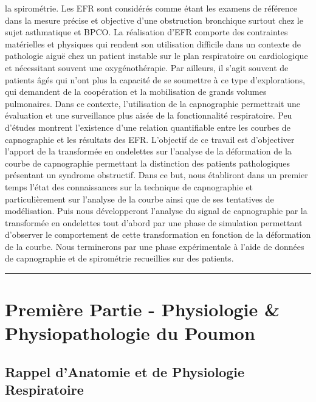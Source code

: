 \documentclass[12pt,]{article}
\begin{document}
la spirométrie. Les EFR sont considérés comme étant les examens de
référence dans la mesure précise et objective d'une obstruction
bronchique surtout chez le sujet asthmatique et BPCO. La réalisation
d'EFR comporte des contraintes matérielles et physiques qui rendent son
utilisation difficile dans un contexte de pathologie aiguë chez un
patient instable sur le plan respiratoire ou cardiologique et
nécessitant souvent une oxygénothérapie. Par ailleurs, il s'agit souvent
de patients âgés qui n'ont plus la capacité de se soumettre à ce type
d'explorations, qui demandent de la coopération et la mobilisation de
grands volumes pulmonaires. Dans ce contexte, l'utilisation de la
capnographie permettrait une évaluation et une surveillance plus aisée
de la fonctionnalité respiratoire. Peu d'études montrent l'existence
d'une relation quantifiable entre les courbes de capnographie et les
résultats des EFR. L'objectif de ce travail est d'objectiver l'apport de
la transformée en ondelettes sur l'analyse de la déformation de la
courbe de capnographie permettant la distinction des patients
pathologiques présentant un syndrome obstructif. Dans ce but, nous
établiront dans un premier temps l'état des connaissances sur la
technique de capnographie et particulièrement sur l'analyse de la courbe
ainsi que de ses tentatives de modélisation. Puis nous développeront
l'analyse du signal de capnographie par la transformée en ondelettes
tout d'abord par une phase de simulation permettant d'observer le
comportement de cette transformation en fonction de la déformation de la
courbe. Nous terminerons par une phase expérimentale à l'aide de données
de capnographie et de spirométrie recueillies sur des patients.

\pagebreak

\begin{center}\rule{0.5\linewidth}{\linethickness}\end{center}

\hypertarget{premiere-partie---physiologie-physiopathologie-du-poumon}{%
\section{Première Partie - Physiologie \& Physiopathologie du
Poumon}\label{premiere-partie---physiologie-physiopathologie-du-poumon}}

\hypertarget{rappel-danatomie-et-de-physiologie-respiratoire}{%
\subsection{Rappel d'Anatomie et de Physiologie
Respiratoire}\label{rappel-danatomie-et-de-physiologie-respiratoire}}
\end{document}
